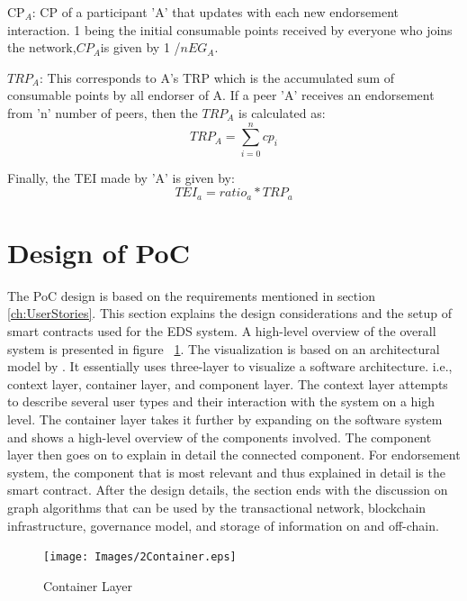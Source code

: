 \acrshort{CP}$_A$: \ac{CP} of a participant 'A' that updates with each
new endorsement interaction. 1 being the initial consumable points received by
everyone who joins the network,\textit{$CP_A$}is given by 1 /\textit{$nEG_A$}.

\textit{$TRP_A$}: This corresponds to A's \ac{TRP} which is the accumulated sum
of consumable points by all endorser of A. If a peer 'A' receives an
endorsement from 'n' number of peers, then the \textit{$TRP_A$} is calculated
as:
\begin{equation}
	TRP_A  = \sum_{i=0}^{n}cp_{i}
\end{equation}

Finally, the \ac{TEI} made by 'A' is given by: \\
\begin{equation}
	TEI_a = ratio_a * TRP_a
\end{equation}

%

\section{Design of PoC}\label{sec:pocDesign}
The PoC design is based on the requirements mentioned in section
\ref{ch:UserStories}. This section explains the design considerations and the
setup of smart contracts used for the EDS system. A high-level overview of the
overall system is presented in figure ~\ref{fig:SystemContainer}. The
visualization is based on an architectural model by \cite{brown2013software}.
It essentially uses three-layer to visualize a software architecture. i.e.,
context layer, container layer, and component layer. The context layer attempts
to describe several user types and their interaction with the system on a high
level. The container layer takes it further by expanding on the software system
and shows a high-level overview of the components involved. The component layer
then goes on to explain in detail the connected component. For endorsement
system, the component that is most relevant and thus explained in detail is the
smart contract.
After the design details, the section ends with the discussion on graph
algorithms that can be used by the transactional network, blockchain
infrastructure, governance model, and storage of information on and off-chain.

\begin{figure}
	\texttt{[image: Images/2Container.eps]}
	\caption{Container Layer}
	\label{fig:SystemContainer}
\end{figure}

